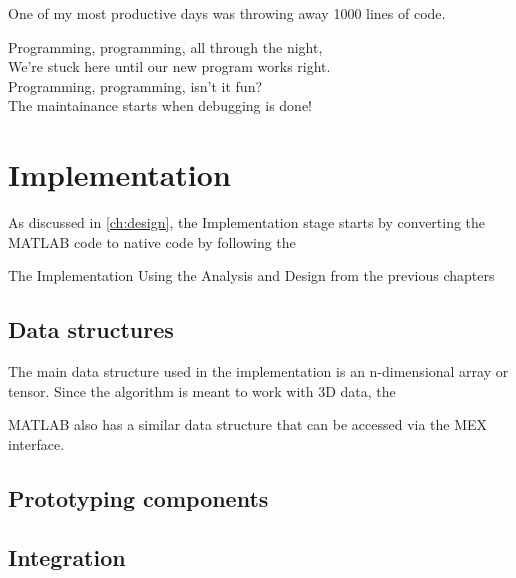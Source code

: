 
\begin{savequote}[0.55\linewidth]
	\begin{fancyquote}
	One of my most productive days was throwing away 1000 lines of code.
	\end{fancyquote}
	\begin{fancyquote}
		Programming, programming, all through the night,\\
		We're stuck here until our new program works right.\\
		Programming, programming, isn't it fun?\\
		The maintainance starts when debugging is done!
	\end{fancyquote}
\end{savequote}
\chapter{Implementation}\label{ch:implementation}

As discussed in \cref{ch:design}, the Implementation stage
starts by converting the MATLAB code to native code by following
the 

The Implementation
Using the Analysis and Design from the previous chapters

\section{Data structures}\label{subsec:impl:ds}


The main data structure used in the implementation is an
n-dimensional array or tensor. Since the algorithm is meant to
work with 3D data, the 

MATLAB also has a similar data structure that can be accessed via the MEX interface.

\section{Prototyping components}

\section{Integration}

